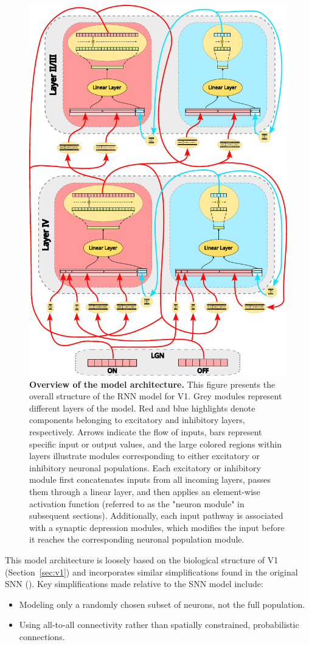 \begin{figure}
    \centering
    \includegraphics[width=0.77\linewidth]{img/model_architecture.pdf}
    \caption{\textbf{Overview of the model architecture.} This figure presents the overall structure of the RNN model for V1. Grey modules represent different layers of the model. Red and blue highlights denote components belonging to excitatory and inhibitory layers, respectively. Arrows indicate the flow of inputs, bars represent specific input or output values, and the large colored regions within layers illustrate modules corresponding to either excitatory or inhibitory neuronal populations. Each excitatory or inhibitory module first concatenates inputs from all incoming layers, passes them through a linear layer, and then applies an element-wise activation function (referred to as the "neuron module" in subsequent sections). Additionally, each input pathway is associated with a synaptic depression modules, which modifies the input before it reaches the corresponding neuronal population module.}
    \label{fig:model_architecture_overview}
\end{figure}

This model architecture is loosely based on the biological structure of V1 (Section~\ref{sec:v1}) and incorporates similar simplifications found in the original SNN (\citet{antolik2024comprehensive}). Key simplifications made relative to the SNN model include:
\begin{itemize}
    \item Modeling only a randomly chosen subset of neurons, not the full population.
    \item Using all-to-all connectivity rather than spatially constrained, probabilistic connections.
\end{itemize}

